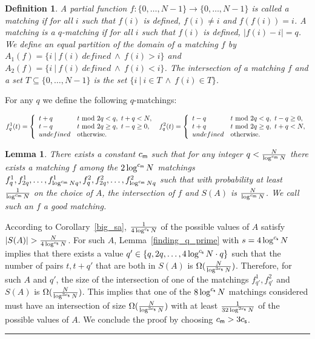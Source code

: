 \documentclass[11pt]{article}
\newtheorem{definition}[theorem]{Definition}
\newtheorem{lemma}[theorem]{Lemma}
\newcommand{\qedsymb}{\hfill{\rule{2mm}{2mm}}}
\newenvironment{proof}{\begin{trivlist}
\item[\hspace{\labelsep}{\sl\noindent Proof:\/}]
}{\qedsymb\end{trivlist}}
\def\mod{{\rm mod}}
\newcommand\C[1]{{ c_{\sf {#1}} }}
\newcommand\alternate[2]{{#1}}
\newcommand\omittedproof[1]{\alternate{#1}{Omitted.}}
\begin{document}
{}{}\begin{definition}
A partial function $f:\{0,\ldots,N-1\} \rightarrow \{0,\ldots,N-1\}$ is called a matching if for all $i$ such that
$f(i)$ is defined, $f(i) \neq i$ and $f(f(i))=i$. A matching is a $q$-matching if for all $i$ such that $f(i)$ is
defined, $|f(i)-i|=q$. We define an equal partition of the domain of a matching $f$ by $A_1(f)=\{i ~|~ f(i)~defined
~\wedge~ f(i)>i\}$ and $A_2(f)=\{i ~|~ f(i)~defined ~\wedge~ f(i)<i\}$. The intersection of a matching $f$ and a set $T
\subseteq \{0,\ldots,N-1\}$ is the set $\{i ~|~ i\in T ~\wedge~ f(i) \in T\}$.
\end{definition}

For any $q$ we define the following $q$-matchings:

$$
f^1_{q}(t)= \left\{
\begin{array}{ll}
    t+q & t~\mod~ 2q < q,~ t+q<N, \\
    t-q & t~\mod~ 2q \ge q,~ t-q\ge 0, \\
    undefined & \mbox{otherwise}.
\end{array} \right.
~ f^2_{q}(t)= \left\{
  \begin{array}{ll}
    t-q & t~\mod~ 2q < q,~ t-q\ge 0,\\
    t+q & t~\mod~ 2q \ge q,~ t+q < N, \\
    undefined & \mbox{otherwise}.
  \end{array} \right.
$$

\begin{lemma}\label{lemma_matching}
There exists a constant $\C{m}$ such that for any integer $q < \frac{N}{\log^{\C{m}} N}$ there exists a matching $f$
among the $2\log^{\C{m}} N$ matchings $f^1_q, f^1_{2q}, \ldots, f^1_{\log^{\C{m}} N q},f^2_q, f^2_{2q}, \ldots,
f^2_{\log^{\C{m}} N q}$ such that with probability at least $\frac{1}{\log^{\C{m}} N}$ on the choice of $A$, the
intersection of $f$ and $S(A)$ is $\frac{N}{\log^{\C{m}} N}$. We call such an $f$ a {\em good} matching.
\end{lemma}
\begin{proof}\omittedproof{
According to Corollary~\ref{big_sa}, $\frac{1}{4\log^{\C{s}} N}$ of the possible values of $A$ satisfy $|S(A)| >
\frac{N}{4\log^{\C{s}} N}$. For such $A$, Lemma~\ref{finding_q_prime} with $s=4\log^{\C{s}} N$ implies that there
exists a value $q'\in\{q,2q,\ldots,4\log^{\C{s}} N \cdot q \}$ such that the number of pairs $t,t+q'$ that are both in
$S(A)$ is $\Omega(\frac{N}{\log^{3\C{s}} N})$. Therefore, for such $A$ and $q'$, the size of the intersection of one of
the matchings $f^1_{q'}, f^2_{q'}$ and $S(A)$ is $\Omega(\frac{N}{\log^{3\C{s}} N})$. This implies that one of the
$8\log^{\C{s}} N$ matchings considered must have an intersection of size $\Omega(\frac{N}{\log^{3\C{s}} N})$ with at
least $\frac{1}{32\log^{2\C{s}} N}$ of the possible values of $A$. We conclude the proof by choosing $\C{m}>3\C{s}$.
}\end{proof}
\end{document}
